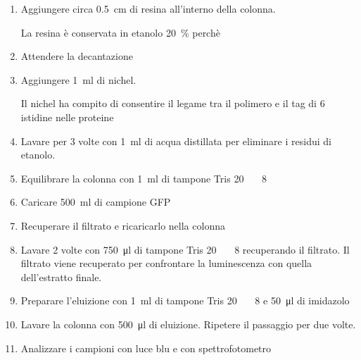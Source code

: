 \begin{enumerate}
	\item Aggiungere circa \qty{0.5}{\cm} di resina all’interno della colonna.
	      \begin{Note}
		      La resina è conservata in etanolo \qty{20}{\percent} perchè
	      \end{Note}
	\item Attendere la decantazione
	\item Aggiungere \qty{1}{\ml} di nichel.
	      \begin{Note}
		      Il nichel ha compito di consentire il legame tra il polimero e il tag di 6 istidine nelle proteine
	      \end{Note}
	\item Lavare per 3 volte con \qty{1}{\ml} di acqua distillata per eliminare i residui di etanolo.
	\item Equilibrare la colonna con \qty{1}{ml} di tampone Tris \qty{20}{\milli\Molar} \pH\ \num{8}
	\item Caricare \qty{500}{\ml} di campione GFP
	\item Recuperare il filtrato e ricaricarlo nella colonna
	\item Lavare 2 volte con \qty{750}{\micro\litre} di tampone Tris \qty{20}{\milli\Molar} \pH\ \num{8} recuperando il filtrato. Il filtrato viene recuperato per confrontare la luminescenza con quella dell’estratto finale.
	\item Preparare l’eluizione con \qty{1}{\ml} di tampone Tris \qty{20}{\milli\Molar} \pH\ \num{8} e \qty{50}{\micro\litre} di imidazolo
	\item Lavare la colonna con \qty{500}{\micro\litre} di eluizione. Ripetere il passaggio per due volte.
	\item Analizzare i campioni con luce blu e con spettrofotometro
\end{enumerate}

\begin{minipage}{0.3\linewidth}
\end{minipage}
\hspace{0.35cm}
\begin{minipage}{0.3\linewidth}
\end{minipage}